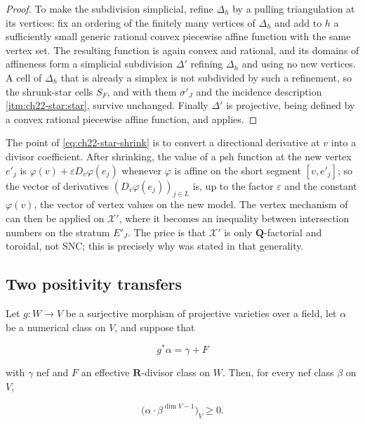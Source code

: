 \begin{proof}
To make the subdivision simplicial, refine \(\Delta_h\) by a pulling
triangulation at its vertices: fix an ordering of the finitely many vertices
of \(\Delta_h\) and add to \(h\) a sufficiently small generic rational convex
piecewise affine function with the same vertex set.  The resulting function
is again convex and rational, and its domains of affineness form a
simplicial subdivision \(\Delta'\) refining \(\Delta_h\) and using no new
vertices.  A cell of \(\Delta_h\) that is already a simplex is not
subdivided by such a refinement, so the shrunk-star cells \(S_F\), and with
them \(\sigma'_J\) and the incidence description
\cref{itm:ch22-star:star}, survive unchanged.  Finally
\(\Delta'\) is projective, being defined by a convex rational piecewise
affine function, and  applies.
\end{proof}

\begin{remark}
\label{rem:ch22-why-shrink}
The point of \eqref{eq:ch22-star-shrink} is to convert a directional
derivative at \(v\) into a divisor coefficient.  After shrinking, the value
of a psh function at the new vertex \(e'_j\) is
\(\varphi(v)+\varepsilon D_v\varphi(e_j)\) whenever \(\varphi\) is affine on
the short segment \([v,e'_j]\); so the vector of derivatives
\((D_v\varphi(e_j))_{j\in L}\) is, up to the factor \(\varepsilon\) and the
constant \(\varphi(v)\), the vector of vertex values on the new model.  The
vertex mechanism of  can then be applied on
\(\mathcal X'\), where it becomes an inequality between intersection numbers
on the stratum \(E'_J\).  The price is that \(\mathcal X'\) is only
\(\mathbf Q\)-factorial and toroidal, not SNC; this is precisely why
 was stated in that generality.
\end{remark}

\subsection{Two positivity transfers}

\begin{lemma}
\label{lem:ch22-pullback-positivity}
Let \(g:W\to V\) be a surjective morphism of projective varieties over a
field, let \(\alpha\) be a numerical class on \(V\), and suppose that

\[
                 g^*\alpha=\gamma+F
\]

with \(\gamma\) nef and \(F\) an effective \(\mathbf R\)-divisor class on
\(W\).  Then, for every nef class \(\beta\) on \(V\),

\[
                      \bigl(\alpha\cdot\beta^{\dim V-1}\bigr)_V\geq0 .
\tag{22.39}\label{eq:ch22-pullback-pseudoeffective}
\]
\end{lemma}

